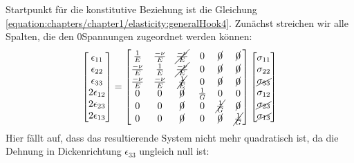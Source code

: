 \documentclass[letterpaper,10pt,german]{jupyterBook}
\begin{document}
\sphinxAtStartPar
Startpunkt für die konstitutive Beziehung ist die Gleichung \eqref{equation:chapters/chapter1/elasticity:generalHook4}. Zunächst streichen wir alle Spalten, die den 0\sphinxhyphen{}Spannungen zugeordnet werden können:
\begin{equation}\label{equation:chapters/chapter1/elasticity:generalHookESZ1}
\begin{split}\begin{bmatrix} 
\epsilon_{11} \\
\epsilon_{22} \\
\epsilon_{33} \\
2\epsilon_{12} \\
2\epsilon_{23} \\
2\epsilon_{13} 
\end{bmatrix} = \begin{bmatrix}
\frac{1}{E} & \frac{-\nu}{E} & \cancel{\frac{-\nu}{E}} & 0 & \cancel{0} & \cancel{0} \\
\frac{-\nu}{E} & \frac{1}{E} & \cancel{\frac{-\nu}{E}} & 0 & \cancel{0} & \cancel{0} \\
{\frac{-\nu}{E}} & {\frac{-\nu}{E}} & \cancel{\frac{1}{E}} & {0} & \cancel{0} & \cancel{0} \\
0 & 0 & \cancel{0} & \frac{1}{G} & 0 & 0 \\
{0} & {0} & \cancel{0} & {0} & \cancel{\frac{1}{G}} & \cancel{0} \\
{0} & {0} & \cancel{0} & {0} & \cancel{0} & \cancel{\frac{1}{G}} \\ 
\end{bmatrix} \begin{bmatrix} \sigma_{11} \\ \sigma_{22} \\ \cancel{\sigma_{33}} \\ \sigma_{12} \\ \cancel{\sigma_{23}} \\ \cancel{\sigma_{13}} \end{bmatrix}\end{split}
\end{equation}
\sphinxAtStartPar
Hier fällt auf, dass das resultierende System nicht mehr quadratisch ist, da die Dehnung in Dickenrichtung \(\epsilon_{33}\) ungleich null ist:
\end{document}
